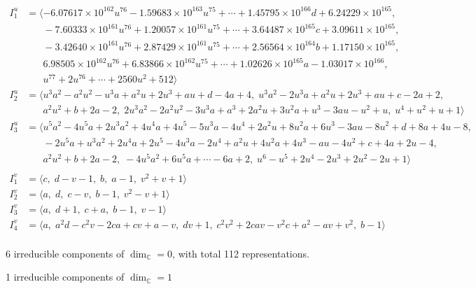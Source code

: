\documentclass[1p]{elsarticle_modified}
\theoremstyle{definition}
\begin{document}
\begin{align*}
I^u_{1}&=\langle 
-6.07617\times10^{162} u^{76}-1.59683\times10^{163} u^{75}+\cdots+1.45795\times10^{166} d+6.24229\times10^{165},\\
\phantom{I^u_{1}}&\phantom{= \langle  }-7.60333\times10^{161} u^{76}+1.20057\times10^{161} u^{75}+\cdots+3.64487\times10^{165} c+3.09611\times10^{165},\\
\phantom{I^u_{1}}&\phantom{= \langle  }-3.42640\times10^{161} u^{76}+2.87429\times10^{161} u^{75}+\cdots+2.56564\times10^{164} b+1.17150\times10^{165},\\
\phantom{I^u_{1}}&\phantom{= \langle  }6.98505\times10^{162} u^{76}+6.83866\times10^{162} u^{75}+\cdots+1.02626\times10^{165} a-1.03017\times10^{166},\\
\phantom{I^u_{1}}&\phantom{= \langle  }u^{77}+2 u^{76}+\cdots+2560 u^2+512\rangle \\
I^u_{2}&=\langle 
u^3 a^2- a^2 u^2- u^3 a+a^2 u+2 u^3+a u+d-4 a+4,\;u^3 a^2-2 u^3 a+a^2 u+2 u^3+a u+c-2 a+2,\\
\phantom{I^u_{2}}&\phantom{= \langle  }a^2 u^2+b+2 a-2,\;2 u^3 a^2-2 a^2 u^2-3 u^3 a+a^3+2 a^2 u+3 u^2 a+u^3-3 a u- u^2+u,\;u^4+u^2+u+1\rangle \\
I^u_{3}&=\langle 
u^5 a^2-4 u^5 a+2 u^3 a^2+4 u^4 a+4 u^5-5 u^3 a-4 u^4+2 a^2 u+8 u^2 a+6 u^3-3 a u-8 u^2+d+8 a+4 u-8,\\
\phantom{I^u_{3}}&\phantom{= \langle  }-2 u^5 a+u^3 a^2+2 u^4 a+2 u^5-4 u^3 a-2 u^4+a^2 u+4 u^2 a+4 u^3- a u-4 u^2+c+4 a+2 u-4,\\
\phantom{I^u_{3}}&\phantom{= \langle  }a^2 u^2+b+2 a-2,\;-4 u^5 a^2+6 u^5 a+\cdots-6 a+2,\;u^6- u^5+2 u^4-2 u^3+2 u^2-2 u+1\rangle \\
\\
I^v_{1}&=\langle 
c,\;d- v-1,\;b,\;a-1,\;v^2+v+1\rangle \\
I^v_{2}&=\langle 
a,\;d,\;c- v,\;b-1,\;v^2- v+1\rangle \\
I^v_{3}&=\langle 
a,\;d+1,\;c+a,\;b-1,\;v-1\rangle \\
I^v_{4}&=\langle 
a,\;a^2 d- c^2 v-2 c a+c v+a- v,\;d v+1,\;c^2 v^2+2 c a v- v^2 c+a^2- a v+v^2,\;b-1\rangle \\
\end{align*}
\raggedright * 6 irreducible components of $\dim_{\mathbb{C}}=0$, with total 112 representations.\\
\raggedright * 1 irreducible components of $\dim_{\mathbb{C}}=1$ \\
\end{document}
